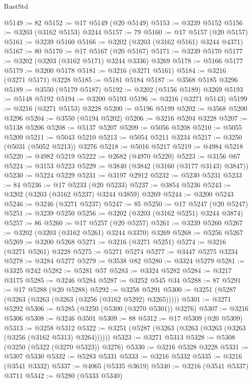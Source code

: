\begin{lexlean}{RustStd}
\begin{coremodule}
@5149 := 82
@5152 := @17 @5149 (@20 @5149)
@5153 := @3239 @5152
@5156 := @3203 (@3162 @5153) @3244
@5157 := 79
@5160 := @17 @5157 (@20 @5157)
@5161 := @3239 @5160
@5166 := @3202 (@3203 (@3162 @5161) @3244 @4371)
@5167 := 80
@5170 := @17 @5167 (@20 @5167)
@5171 := @3239 @5170
@5177 := @3202 (@3203 (@3162 @5171) @3244 @3336) @3269
@5178 := @5166 @5177
@5179 := @3200 @5178
@5181 := @3216 (@3271 @5161)
@5184 := @3216 (@3271 @5171) @3228
@5185 := @5181 @5184
@5187 := @3568 @5185 @3296
@5189 := @3550 (@5179 @5187)
@5192 := @3202 (@5156 @5189) @3269
@5193 := @5148 @5192
@5194 := @3200 @5193
@5196 := @3216 (@3271 @5143)
@5199 := @3216 (@3271 @5153) @3228
@5200 := @5196 @5199
@5202 := @3568 @5200 @3296
@5204 := @3550 (@5194 @5202)
@5206 := @3216 @5204 @3228
@5207 := @5138 @5206
@5208 := @5137 @5207
@5209 := @5056 @5208
@5210 := @5055 @5209
@5211 := @5043 @5210
@5213 := @5054 @5211 @3234
@5217 := @3250 (@5031 (@5052 @5213)) @3276
@5218 := @5016 @5217
@5219 := @4984 @5218
@5220 := @4982 @5219
@5222 := @2682 (@4970 @5220)
@5223 := @3156 @67
@5224 := @3153 @5223
@5229 := @3840 (@3842 (@3160 (@3177 @3143) @3847))
@5230 := @5224 @5229
@5231 := @3197 @2912
@5232 := @5230 @5231
@5233 := 84
@5236 := @17 @5233 (@20 @5233)
@5237 := @3854 @5236
@5243 := @3202 (@3203 (@3162 @5237) @3244 @3859) @3269
@5244 := @3200 @5243
@5246 := @3246 (@3271 @5237)
@5247 := 85
@5250 := @17 @5247 (@20 @5247)
@5251 := @3239 @5250
@5256 := @3202 (@3203 (@3162 @5251) @3244 @3874)
@5257 := 86
@5260 := @17 @5257 (@20 @5257)
@5261 := @3239 @5260
@5267 := @3202 (@3203 (@3162 @5261) @3244 @3370) @3269
@5268 := @5256 @5267
@5269 := @3200 @5268
@5271 := @3216 (@3271 @5251)
@5274 := @3216 (@3271 @5261) @3228
@5275 := @5271 @5274
@5277 := @3447 @5275 @3234
@5278 := @3284 @5277
@5279 := @3538 @82
@5280 := @3324 @5279
@5281 := @3325 @242
@5282 := @5281 @57
@5283 := @3324 @5282
@5284 := @3217 @3175
@5285 := @3246 @5284
@5287 := @3252 @545 @34
@5288 := 87
@5291 := @17 @5288 (@20 @5288)
@5292 := @3258 @5291
@5300 := @3251 (@5287 (@3263 (@3263 (@3263 (@3256 (@3162 @5292) @3265)))))
@5301 := @3271 @5292
@5306 := @5285 (@3250 (@5300 (@3270 @5301)) @3276)
@5307 := @3216 @5306
@5308 := @3246 @3501
@5309 := 88
@5312 := @17 @5309 (@20 @5309)
@5313 := @3258 @5312
@5322 := @3251 (@5287 (@3263 (@3263 (@3263 (@3263 (@3256 (@3162 @5313) @3264))))))
@5323 := @3271 @5313
@5328 := @5308 (@3250 (@5322 (@3270 @5323)) @3276)
@5330 := @3216 @5328 @3228
@5331 := @5307 @5330
@5332 := @5283 @5331
@5333 := @3216 @5332
@5335 := @3216 (@3541 @3332)
@5337 := @4065 (@5335 @3619)
@5340 := @3216 (@3541 @5337) @3711
@5342 := @5280 (@5333 @5340)

\end{coremodule}
\end{lexlean}
